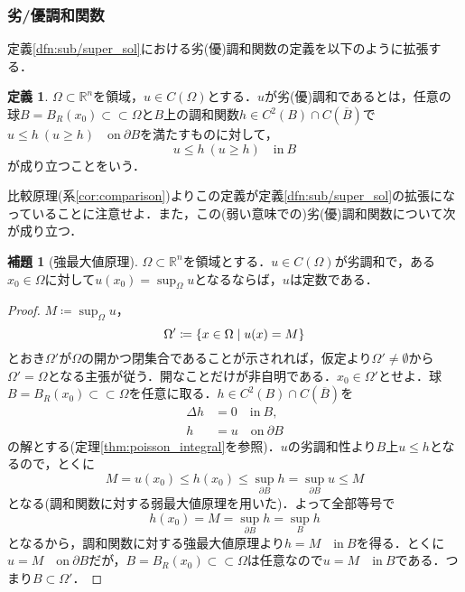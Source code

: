 \documentclass[a4paper]{ltjsarticle}
\newcommand{\Rset}{\mathbb{R}}
\newcommand{\Om}{\Omega}
\newcommand{\ssubset}{\subset\subset}
\newcommand{\inn}{\quad\text{in}\ }
\newcommand{\on}{\quad \text{on}\ }
\newcommand{\1}{\mathbbm{1}}
\numberwithin{equation}{section}
\theoremstyle{definition}
\newtheorem{dfn}[thm]{定義}
\newtheorem{lem}[thm]{補題}
\begin{document}
\subsubsection{劣/優調和関数}
定義\ref{dfn:sub/super_sol}における劣(優)調和関数の定義を以下のように拡張する．
\begin{dfn}
    $\Om\subset \Rset^n$を領域，$u\in C(\Om)$とする．$u$が劣(優)調和であるとは，任意の球$B=B_R(x_0)\ssubset \Om$と$B$上の調和関数$h\in C^2(B)\cap C(\overline{B})$で$u\leq h\ (u\geq h)\on \partial B$を満たすものに対して，
    \begin{equation}
        u\leq h\ (u\geq h)\inn B 
    \end{equation}
    が成り立つことをいう．
\end{dfn}
比較原理(系\ref{cor:comparison})よりこの定義が定義\ref{dfn:sub/super_sol}の拡張になっていることに注意せよ．また，この(弱い意味での)劣(優)調和関数について次が成り立つ．
\begin{lem}[強最大値原理]\label{lem:perron_1}
    $\Om\subset \Rset^n$を領域とする．$u\in C(\Om)$が劣調和で，ある$x_0\in\Om$に対して$u(x_0)=\sup_{\Om}u$となるならば，$u$は定数である．
\end{lem}
\begin{proof}
    $M\coloneqq \sup_\Om u$，
    \begin{equation}
        \Om'\coloneqq \qty{x\in\Om\mid u(x)=M}
    \end{equation}
    とおき$\Om'$が$\Om$の開かつ閉集合であることが示されれば，仮定より$\Om'\neq\emptyset$から$\Om'=\Om$となる主張が従う．開なことだけが非自明である．$x_0\in\Om'$とせよ．球$B=B_R(x_0)\ssubset \Om$を任意に取る．$h\in C^2(B)\cap C(\overline{B})$を
    \begin{align}
        \Delta h&=0\inn B,\\
        h&=u\on \partial B 
    \end{align}
    の解とする(定理\ref{thm:poisson_integral}を参照)．$u$の劣調和性より$B$上$u\leq h$となるので，とくに
    \begin{equation}
        M=u(x_0)\leq h(x_0)\leq \sup_{\partial B}h=\sup_{\partial B}u\leq M
    \end{equation}
    となる(調和関数に対する弱最大値原理を用いた)．よって全部等号で 
    \begin{equation}
        h(x_0)=M=\sup_{\partial B}h=\sup_{B}h 
    \end{equation}
    となるから，調和関数に対する強最大値原理より$h=M\inn B$を得る．とくに$u=M\on \partial B$だが，$B=B_R(x_0)\ssubset \Om$は任意なので$u=M\inn B$である．つまり$B\subset \Om'$．
\end{proof}
\end{document}
